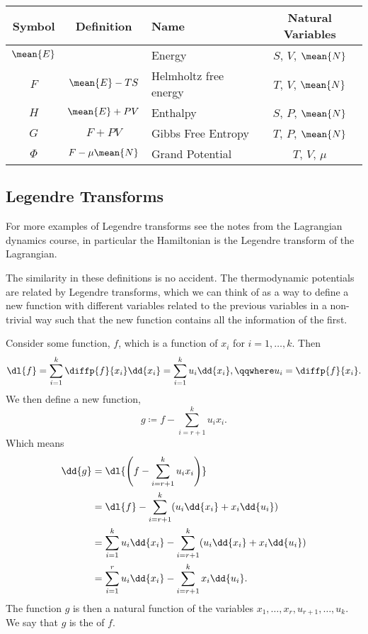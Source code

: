 \documentclass[fleqn]{NotesClass}
\begin{document}
    \begin{center}
         \begin{tabular}{cclc}\toprule
             Symbol & Definition & Name & Natural Variables \\ \midrule
             \(\mean{E}\) & & Energy & \(S\), \(V\), \(\mean{N}\)\\
             \(F\) & \(\mean{E} - TS\) & Helmholtz free energy & \(T\), \(V\), \(\mean{N}\)\\
             \(H\) & \(\mean{E} + PV\) & Enthalpy & \(S\), \(P\), \(\mean{N}\)\\
             \(G\) & \(F + PV\) & Gibbs Free Entropy & \(T\), \(P\), \(\mean{N}\)\\
             \(\Phi\) & \(F - \mu \mean{N}\) & Grand Potential & \(T\), \(V\), \(\mu\)\\ \bottomrule
         \end{tabular}
    \end{center}
    
    \subsection{Legendre Transforms}
    \begin{rmk}
        For more examples of Legendre transforms see the notes from the Lagrangian dynamics course, in particular the Hamiltonian is the Legendre transform of the Lagrangian.
    \end{rmk}
    The similarity in these definitions is no accident.
    The thermodynamic potentials are related by Legendre transforms, which we can think of as a way to define a new function with different variables related to the previous variables in a non-trivial way such that the new function contains all the information of the first.
    
    Consider some function, \(f\), which is a function of \(x_i\) for \(i = 1, \dotsc, k\).
    Then
    \begin{equation}
        \dl{f} = \sum_{i = 1}^{k} \diffp{f}{x_i}\dd{x_i} = \sum_{i = 1}^{k} u_i\dd{x_i}, \qqwhere u_i = \diffp{f}{x_i}.
    \end{equation}
    We then define a new function,
    \begin{equation}
        g \coloneqq f - \sum_{i = r + 1}^{k} u_ix_i.
    \end{equation}
    Which means
    \begin{align}
        \dd{g} &= \dl{\left( f - \sum_{i = r + 1}^{k} u_i x_i \right)}\\
        &= \dl{f} - \sum_{i = r + 1}^{k} (u_i \dd{x_i} + x_i \dd{u_i})\\
        &= \sum_{i=1}^{k} u_i\dd{x_i} - \sum_{i = r + 1}^{k} (u_i \dd{x_i} + x_i \dd{u_i})\\
        &= \sum_{i=1}^{r} u_i \dd{x_i} - \sum_{i = r + 1}^{k} x_i \dd{u_i}.
    \end{align}
    The function \(g\) is then a natural function of the variables \(x_1, \dotsc, x_r, u_{r+1}, \dotsc, u_k\).
    We say that \(g\) is the  of \(f\).
    
\end{document}
